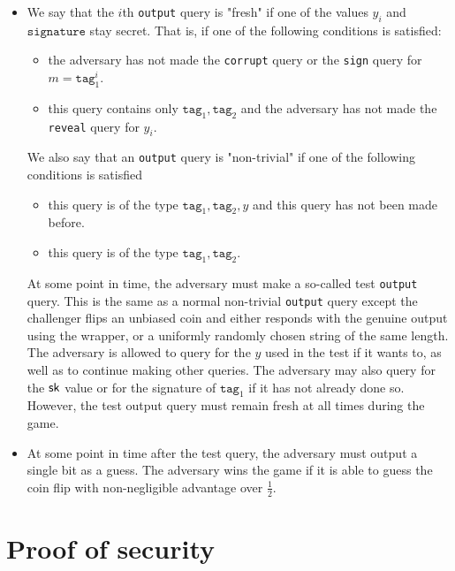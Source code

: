 \documentclass{article}
\begin{document}
\begin{itemize}
	\item We say that the $i$th \texttt{output} query is "fresh" if one of the values $y_i$ and $\mathrm{\texttt{signature}}$ stay secret. That is, if one of the following conditions is satisfied:
	\begin{itemize}
		\item the adversary has not made the \texttt{corrupt} query or the \texttt{sign} query for $m = \texttt{tag}_1^i$. 
		\item this query contains only $\texttt{tag}_1, \texttt{tag}_2$ and the adversary has not made the \texttt{reveal} query for  $y_i$.
	\end{itemize}
	
We also say that an \texttt{output} query is "non-trivial" if one of the following conditions is satisfied
	
	\begin{itemize}
		\item this query is of the type $\texttt{tag}_1, \texttt{tag}_2, y$ and this query has not been made before. 
		
		\item this query is of the type $\texttt{tag}_1, \texttt{tag}_2$.  
	\end{itemize}
	
	
	At some point in time, the adversary must make a so-called test \texttt{output} query. This is the same as a normal non-trivial \texttt{output} query except the challenger flips an unbiased coin and either responds with the genuine output using the wrapper, or a uniformly randomly chosen string of the same length. The adversary is allowed to query for the $y$ used in the test if it wants to, as well as to continue making other queries. The adversary may also query for the $\mathsf{sk}$ value or for the signature of $\texttt{tag}_1$ if it has not already done so. However, the test output query must remain fresh at all times during the game.
	
\item At some point in time after the test query, the adversary must output a single bit as a guess. The adversary wins the game if it is able to guess the coin flip with non-negligible advantage over $\frac{1}{2}$.
\end{itemize}

\section{Proof of security} \label{proof}
\end{document}
